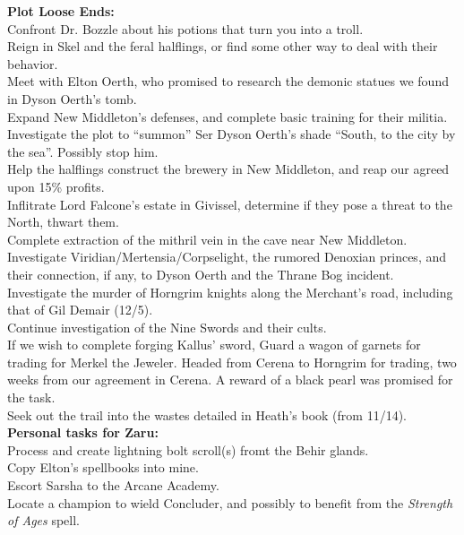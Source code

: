 \documentclass[letterpaper]{article}
\begin{document}
\noindent \textbf{Plot Loose Ends:} \\
Confront Dr. Bozzle about his potions that turn you into a troll.\\
Reign in Skel and the feral halflings, or find some other way to deal with their behavior.\\
Meet with Elton Oerth, who promised to research the demonic statues we found in Dyson Oerth's tomb.\\
Expand New Middleton's defenses, and complete basic training for their militia.\\
Investigate the plot to ``summon'' Ser Dyson Oerth's shade ``South, to the city by the sea''. Possibly stop him.\\
Help the halflings construct the brewery in New Middleton, and reap our agreed upon 15\% profits.\\
Inflitrate Lord Falcone's estate in Givissel, determine if they pose a threat to the North, thwart them.\\
Complete extraction of the mithril vein in the cave near New Middleton.\\
Investigate Viridian/Mertensia/Corpselight, the rumored Denoxian princes, and their connection, if any, to Dyson Oerth and the Thrane Bog incident.\\
Investigate the murder of Horngrim knights along the Merchant's road, including that of Gil Demair (12/5).\\
Continue investigation of the Nine Swords and their cults.\\
If we wish to complete forging Kallus' sword, Guard a wagon of garnets for trading for Merkel the Jeweler. Headed from Cerena to Horngrim for trading, two weeks from our agreement in Cerena. A reward of a black pearl was promised for the task.\\
Seek out the trail into the wastes detailed in Heath's book (from 11/14).\\

\noindent\textbf{Personal tasks for Zaru:}\\
Process and create lightning bolt scroll(s) fromt the Behir glands.\\
Copy Elton's spellbooks into mine.\\
Escort Sarsha to the Arcane Academy.\\
Locate a champion to wield Concluder, and possibly to benefit from the \emph{Strength of Ages} spell.\\
\end{document}
